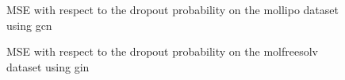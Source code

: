 
\begin{figure}
    \centering
    \caption{MSE with respect to the dropout probability on the mollipo dataset using \ac{gcn}}
    \label{fig:prob-gcn-mollipo}
\end{figure}




\begin{figure}
    \centering
    \caption{MSE with respect to the dropout probability on the molfreesolv dataset using \ac{gin}}
    \label{fig:prob-gin-molfreesolv}
\end{figure}



